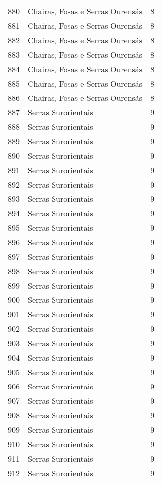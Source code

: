 \begin{table}[p]
\begin{tabular}{rlr}
  880 & Chairas, Fosas e Serras Ourensás &   8 \\ 
  881 & Chairas, Fosas e Serras Ourensás &   8 \\ 
  882 & Chairas, Fosas e Serras Ourensás &   8 \\ 
  883 & Chairas, Fosas e Serras Ourensás &   8 \\ 
  884 & Chairas, Fosas e Serras Ourensás &   8 \\ 
  885 & Chairas, Fosas e Serras Ourensás &   8 \\ 
  886 & Chairas, Fosas e Serras Ourensás &   8 \\ 
  887 & Serras Surorientais &   9 \\ 
  888 & Serras Surorientais &   9 \\ 
  889 & Serras Surorientais &   9 \\ 
  890 & Serras Surorientais &   9 \\ 
  891 & Serras Surorientais &   9 \\ 
  892 & Serras Surorientais &   9 \\ 
  893 & Serras Surorientais &   9 \\ 
  894 & Serras Surorientais &   9 \\ 
  895 & Serras Surorientais &   9 \\ 
  896 & Serras Surorientais &   9 \\ 
  897 & Serras Surorientais &   9 \\ 
  898 & Serras Surorientais &   9 \\ 
  899 & Serras Surorientais &   9 \\ 
  900 & Serras Surorientais &   9 \\ 
  901 & Serras Surorientais &   9 \\ 
  902 & Serras Surorientais &   9 \\ 
  903 & Serras Surorientais &   9 \\ 
  904 & Serras Surorientais &   9 \\ 
  905 & Serras Surorientais &   9 \\ 
  906 & Serras Surorientais &   9 \\ 
  907 & Serras Surorientais &   9 \\ 
  908 & Serras Surorientais &   9 \\ 
  909 & Serras Surorientais &   9 \\ 
  910 & Serras Surorientais &   9 \\ 
  911 & Serras Surorientais &   9 \\ 
  912 & Serras Surorientais &   9 \\ 

\end{tabular}
\end{table}
